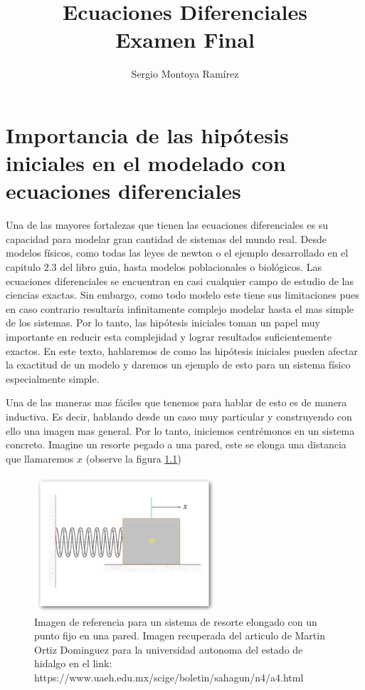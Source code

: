 \documentclass{report}
\title{\Huge{Ecuaciones Diferenciales}\\Examen Final}
\author{\huge{Sergio Montoya Ramírez}}
\date{}
\begin{document}
\maketitle
\newpage%
\tableofcontents
\pagebreak

\chapter{Importancia de las hipótesis iniciales en el modelado con ecuaciones diferenciales}

Una de las mayores fortalezas que tienen las ecuaciones diferenciales es su capacidad para modelar gran cantidad de sistemas del mundo real. Desde modelos físicos, como todas las leyes de newton o el ejemplo desarrollado en el capitulo $2.3$ del libro guia, hasta modelos poblacionales o biológicos. Las ecuaciones diferenciales se encuentran en casi cualquier campo de estudio de las ciencias exactas. Sin embargo, como todo modelo este tiene sus limitaciones pues en caso contrario resultaría infinitamente complejo modelar hasta el mas simple de los sistemas. Por lo tanto, las hipótesis iniciales toman un papel muy importante en reducir esta complejidad y lograr resultados suficientemente exactos. En este texto, hablaremos de como las hipótesis iniciales pueden afectar la exactitud de un modelo y daremos un ejemplo de esto para un sistema físico especialmente simple.

Una de las maneras mas fáciles que tenemos para hablar de esto es de manera inductiva. Es decir, hablando desde un caso muy particular y construyendo con ello una imagen mas general. Por lo tanto, iniciemos centrémonos en un sistema concreto. Imagine un resorte pegado a una pared, este se elonga una distancia que llamaremos $x$ (observe la figura \ref{fig:image-resorte-jpeg})

\begin{figure}[h]
  \centering
  \includegraphics[width=0.6\textwidth]{image/resorte.jpeg}
  \caption{Imagen de referencia para un sistema de resorte elongado con un punto fijo en una pared. Imagen recuperada del articulo de Martin Ortiz Dominguez para la universidad autonoma del estado de hidalgo en el link: https://www.uaeh.edu.mx/scige/boletin/sahagun/n4/a4.html} 
  \label{fig:image-resorte-jpeg}
\end{figure}
\end{document}
